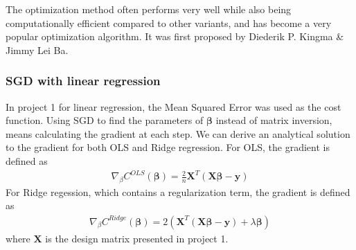 \documentclass[a4paper,twocolumn]{article}
\newcommand{\y}{\mathbf{y}}
\newcommand{\X}{\mathbf{X}}
\newcommand{\B}{\boldsymbol{\beta}}
\begin{document}
The optimization method often performs very well while also being computationally efficient compared to other variants, and has become a very popular optimization algorithm. It was first proposed by Diederik P. Kingma \& Jimmy Lei Ba.\cite{ADAM}
\subsubsection{SGD with linear regression}
In project 1 for linear regression, the Mean Squared Error was used as the cost function.\cite{project1} Using SGD to find the parameters of $\B$ instead of matrix inversion, means calculating the gradient at each step. We can derive an analytical solution to the gradient for both OLS and Ridge regression. For OLS, the gradient is defined as
\begin{align}
    \nabla_{\beta} C^{OLS}(\B) = \frac{2}{n}\X^{T}(\X\B - \y)
\end{align}
For Ridge regession, which contains a regularization term, the gradient is defined as
\begin{align}
    \nabla_{\beta} C^{Ridge}(\B) = 2(\X^{T}(\X\B-\y)+\lambda\B)
\end{align}
where $\X$ is the design matrix presented in project 1.
\end{document}
